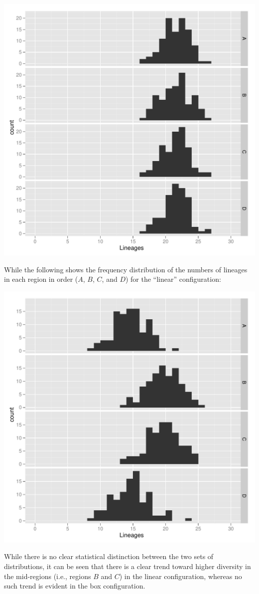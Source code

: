 \documentclass[11pt]{article}
\begin{document}
\begin{center}
	\includegraphics[scale=0.6]{results-lineages-box-d1.pdf}
\end{center}

While the following shows the frequency distribution of the numbers of lineages in each region in order ($A$, $B$, $C$, and $D$) for the ``linear'' configuration:

\begin{center}
	\includegraphics[scale=0.6]{results-lineages-linear-d1.pdf}
\end{center}

While there is no clear statistical distinction between the two sets of distributions, it can be seen that there is a clear trend toward higher diversity in the mid-regions (i.e., regions $B$ and $C$) in the linear configuration, whereas no such trend is evident in the box configuration.
\end{document}
